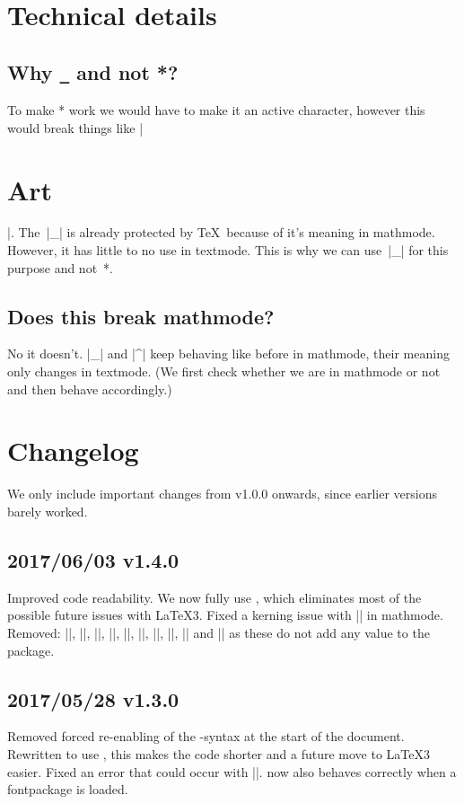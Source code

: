 \documentclass[11pt, cm-default]{l3doc}
\begin{document}
	\section{Technical details}
	\subsection{Why \texttt{\_} and not *?\label{Why?!}}
	To make * work we would have to make it an active character, however this would
	break things like |\section*{Art}|. The~|_| is already protected by \TeX\ because
	of it's meaning in mathmode. However, it has little to no use in textmode. This
	is why we can use~|_| for this purpose and not~*.
	
	\subsection{Does this break mathmode?}
	No it doesn't. |_| and |^| keep behaving like before in mathmode, their meaning
	only changes in textmode. (We first check whether we are in mathmode or not and
	then behave accordingly.)


	\section{Changelog}
	We only include important changes from v1.0.0 onwards, since earlier versions
	barely worked.

	\subsection*{2017/06/03 v1.4.0}
	Improved code readability.
	We now fully use , which eliminates most of the possible future
	issues with \LaTeX3. Fixed a kerning issue with |\cir| in mathmode. Removed:
	|\setundact|, |\setundsub|, |\setciract|, |\setcirsup|, |\nrfamily|, |\nrshape|,
	|\nrseries|, |\setffamily|, |\setfshape| and |\setfseries| as these do not add
	any value to the package.

	\subsection*{2017/05/28 v1.3.0}
	Removed forced re-enabling of the -syntax at the start of the
	document. Rewritten to use , this makes the code shorter and a future
	move to \LaTeX3 easier. Fixed an error that could occur with |\cir|.
	 now also behaves correctly when a fontpackage is loaded.
\end{document}
